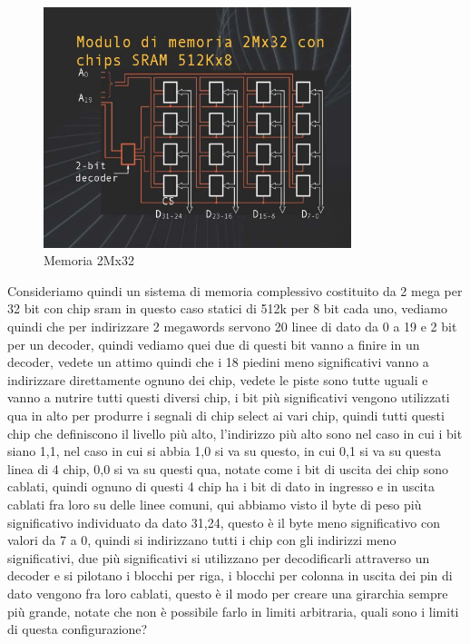 \FloatBarrier
\begin{figure}[H]
  \centering
  \includegraphics[width=0.80\textwidth,
                    trim=40 40 10 40, %
                    clip]
                    {images/Lez04_p02_fig_05.png}
  \caption{Memoria 2Mx32}
  \label{fig:Lez04_p02_fig_05}
\end{figure}
\FloatBarrier
\noindent

Consideriamo quindi un sistema di memoria complessivo costituito da 2 mega per 32 bit con chip sram in questo caso statici di 512k per 8 bit cada uno, vediamo quindi che per indirizzare 2 megawords servono 20 linee di dato da 0 a 19 e 2 bit per un decoder, quindi vediamo quei due di questi bit vanno a finire in un decoder, vedete un attimo quindi che i 18 piedini meno significativi vanno a indirizzare direttamente ognuno dei chip, vedete le piste sono tutte uguali e vanno a nutrire tutti questi diversi chip, i bit più significativi vengono utilizzati qua in alto per produrre i segnali di chip select ai vari chip, quindi tutti questi chip che definiscono il livello più alto, l'indirizzo più alto sono nel caso in cui i bit siano 1,1, nel caso in cui si abbia 1,0 si va su questo, in cui 0,1 si va su questa linea di 4 chip, 0,0 si va su questi qua, notate come i bit di uscita dei chip sono cablati, quindi ognuno di questi 4 chip ha i bit di dato in ingresso e in uscita cablati fra loro su delle linee comuni, qui abbiamo visto il byte di peso più significativo individuato da dato 31,24, questo è il byte meno significativo con valori da 7 a 0, quindi si indirizzano tutti i chip con gli indirizzi meno significativi, due più significativi si utilizzano per decodificarli attraverso un decoder e si pilotano i blocchi per riga, i blocchi per colonna in uscita dei pin di dato vengono fra loro cablati, questo è il modo per creare una girarchia sempre più grande, notate che non è possibile farlo in limiti arbitraria, quali sono i limiti di questa configurazione?

